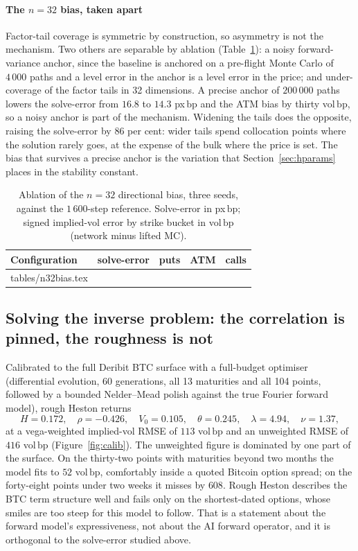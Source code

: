 \documentclass[preprint,12pt]{elsarticle}
\makeatletter
\newcommand{\bp}{\ensuremath{\,\mathrm{bp}}}
\newcommand{\revrows}[1]{\@@input tables/#1.tex }
\makeatother
\begin{document}
\paragraph{The $n{=}32$ bias, taken apart}
Factor-tail coverage is symmetric by construction, so asymmetry is not the
mechanism. Two others are separable by ablation (Table~\ref{tab:n32}): a noisy
forward-variance anchor, since the baseline is anchored on a pre-flight Monte
Carlo of $4\,000$ paths and a level error in the anchor is a level error in the
price; and under-coverage of the factor tails in 32 dimensions. A precise anchor
of $200\,000$ paths lowers the solve-error from $16.8$ to $14.3$ px\bp{} and the
ATM bias by thirty vol\bp{}, so a noisy anchor is part of the mechanism. Widening
the tails does the opposite, raising the solve-error by $86$ per cent: wider tails
spend collocation points where the solution rarely goes, at the expense of the
bulk where the price is set. The bias that survives a precise anchor is the
variation that Section~\ref{sec:hparams} places in the stability constant.
\begin{table}[!htbp]
\centering
\caption{Ablation of the $n{=}32$ directional bias, three seeds, against the
$1\,600$-step reference. Solve-error in px\bp; signed implied-vol error by strike
bucket in vol\bp{} (network minus lifted MC).}
\label{tab:n32}
\footnotesize
\begin{tabular}{@{}l r r r r@{}}
\toprule
Configuration & solve-error & puts & ATM & calls \\
\midrule
\revrows{n32bias}
\bottomrule
\end{tabular}
\end{table}
\fi

\subsection{Solving the inverse problem: the correlation is pinned, the roughness is not}
\label{sec:btc}
Calibrated to the full Deribit BTC surface with a full-budget optimiser
(differential evolution, 60 generations, all 13 maturities and all 104 points,
followed by a bounded Nelder--Mead polish against the true Fourier forward
model), rough Heston returns
\begin{equation*}
  H{=}0.172,\quad \rho{=}{-}0.426,\quad V_0{=}0.105,\quad
  \theta{=}0.245,\quad \lambda{=}4.94,\quad \nu{=}1.37,
\end{equation*}
at a vega-weighted implied-vol RMSE of $113$ vol\bp{} and an unweighted RMSE of
$416$ vol\bp{} (Figure~\ref{fig:calib}). The unweighted figure is dominated by
one part of the surface. On the thirty-two points with maturities beyond two
months the model fits to $52$ vol\bp{}, comfortably inside a quoted Bitcoin
option spread; on the forty-eight points under two weeks it misses by $608$.
Rough Heston describes the BTC term structure well and fails only on the
shortest-dated options, whose smiles are too steep for this model to follow.
That is a statement about the forward model's expressiveness, not about the AI
forward operator, and it is orthogonal to the solve-error studied above.
\end{document}
